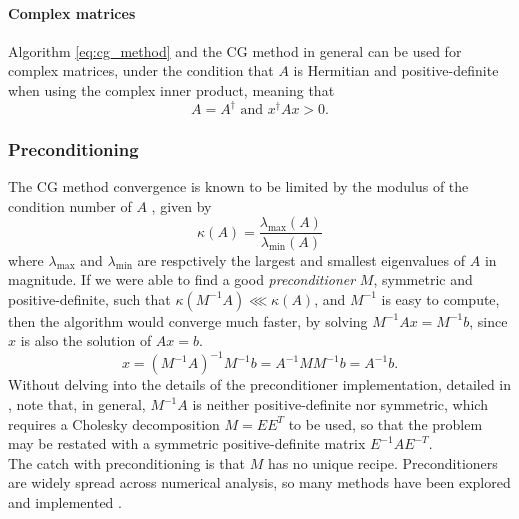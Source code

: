 \paragraph{Complex matrices} Algorithm \eqref{eq:cg_method} and the CG method in general can be used for complex matrices, under the condition that $A$ is Hermitian and positive-definite when using the complex inner product, meaning that
\begin{equation}
    A = A^\dagger\text{ and }
    x^\dagger Ax > 0.
\end{equation}
\subsubsection{Preconditioning}
\label{sec:preconditioning}
The CG method convergence is known to be limited by the modulus of the condition number of $A$ \cite{PainlessCGM}, given by 
\begin{equation}
    \label{eq:cond_num}
    \kappa(A) = \frac{\lambda_\text{max}(A)}{\lambda_\text{min}(A)}
\end{equation}
where $\lambda_\text{max}$ and $\lambda_\text{min}$ are respctively the largest and smallest eigenvalues of $A$ in magnitude.
If we were able to find a good \textit{preconditioner} $M$, symmetric and positive-definite, such that $\kappa(M^{-1}A) \lll \kappa(A)$, and $M^{-1}$ is easy to compute, then the algorithm would converge much faster, by solving $M^{-1}Ax = M^{-1}b$, since $x$ is also the solution of $Ax = b$.
\begin{equation}
    \label{eq:precond}
    x = (M^{-1}A)^{-1} M^{-1}b = A^{-1} MM^{-1} b = A^{-1} b.
\end{equation}
Without delving into the details of the preconditioner implementation, detailed in \cite{PainlessCGM}, note that, in general, $M^{-1}A$ is neither positive-definite nor symmetric, which requires a Cholesky decomposition \cite{cholesky} $M = EE^T$ to be used, so that the problem may be restated with a symmetric positive-definite matrix $E^{-1}AE^{-T}$.
\\The catch with preconditioning is that $M$ has no unique recipe. Preconditioners are widely spread across numerical analysis, so many methods have been explored and implemented \cite{pearson2020preconditioners}.
